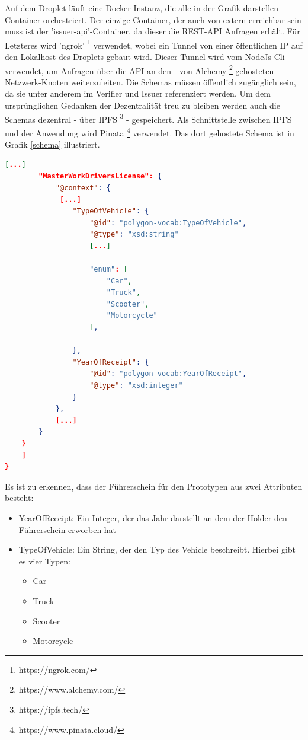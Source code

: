 Auf dem Droplet läuft eine Docker-Instanz, die alle in der Grafik darstellen Container orchestriert. Der einzige Container, der auch von extern erreichbar sein muss ist der 'issuer-api'-Container, da dieser die REST-API Anfragen erhält. Für Letzteres wird 'ngrok' \footnote{https://ngrok.com/} verwendet, wobei ein Tunnel von einer öffentlichen IP auf den Lokalhost des Droplets gebaut wird. Dieser Tunnel wird vom NodeJs-Cli verwendet, um Anfragen über die API an den - von Alchemy \footnote{https://www.alchemy.com/} gehosteten - Netzwerk-Knoten weiterzuleiten. Die Schemas müssen öffentlich zugänglich sein, da sie unter anderem im Verifier und Issuer referenziert werden. Um dem ursprünglichen Gedanken der Dezentralität treu zu bleiben werden auch die Schemas dezentral - über IPFS \footnote{https://ipfs.tech/} - gespeichert. Als Schnittstelle zwischen IPFS und der Anwendung wird Pinata \footnote{https://www.pinata.cloud/} verwendet. Das dort gehostete Schema ist in Grafik \ref{schema} illustriert.
\begin{lstlisting}[language=json,firstnumber=1, caption=Schema des Credentials, label=schema]	
		[...]
		"MasterWorkDriversLicense": {
			"@context": {
			 [...]
				"TypeOfVehicle": {
					"@id": "polygon-vocab:TypeOfVehicle",
					"@type": "xsd:string"
					[...]
					
					"enum": [
						"Car",
						"Truck",
						"Scooter",
						"Motorcycle"
					],
					
				},
				"YearOfReceipt": {
					"@id": "polygon-vocab:YearOfReceipt",
					"@type": "xsd:integer"
				}
			},
			[...]
		}
	}
	]
}
\end{lstlisting}
Es ist zu erkennen, dass der Führerschein für den Prototypen aus zwei Attributen besteht:
\begin{itemize}
	\item YearOfReceipt: Ein Integer, der das Jahr darstellt an dem der Holder den Führerschein erworben hat
	\item TypeOfVehicle: Ein String, der den Typ des Vehicle beschreibt. Hierbei gibt es vier Typen: 
	
	\begin{itemize}
		\item Car
		\item Truck
		\item Scooter
		\item Motorcycle
	\end{itemize}
\end{itemize}

